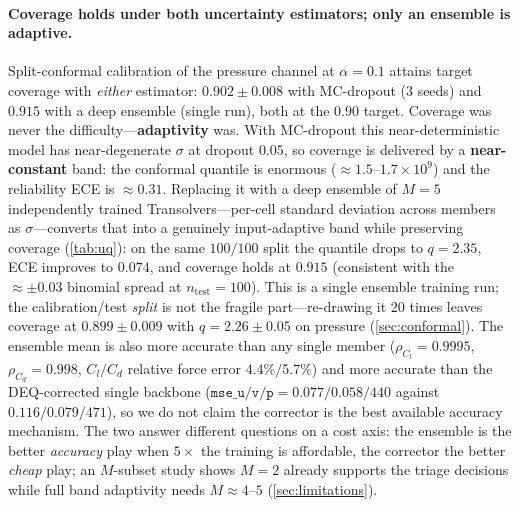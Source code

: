 \paragraph{Coverage holds under both uncertainty estimators; only an ensemble is
adaptive.} Split-conformal calibration of the pressure channel at $\alpha=0.1$ attains
target coverage with \emph{either} estimator: $0.902{\pm}0.008$ with MC-dropout (3 seeds)
and $0.915$ with a deep ensemble (single run), both at the $0.90$ target. Coverage was
never the difficulty---\textbf{adaptivity} was. With MC-dropout this near-deterministic
model has near-degenerate $\sigma$ at dropout $0.05$, so coverage is delivered by a
\textbf{near-constant} band: the conformal quantile is enormous ($\approx 1.5$--$1.7\times
10^{9}$) and the reliability ECE is $\approx 0.31$. Replacing it with a deep ensemble of
$M{=}5$ independently trained Transolvers---per-cell standard deviation across members as
$\sigma$---converts that into a genuinely input-adaptive band while preserving coverage
(\autoref{tab:uq}): on the same $100/100$ split the quantile drops to $q=2.35$, ECE
improves to $\mathbf{0.074}$, and coverage holds at $0.915$ (consistent with the
$\approx{\pm}0.03$ binomial spread at $n_{\text{test}}=100$). This is a single ensemble
training run; the calibration/test \emph{split} is not the fragile part---re-drawing it
$20$ times leaves coverage at $0.899{\pm}0.009$ with $q=2.26{\pm}0.05$ on pressure
(\autoref{sec:conformal}). The ensemble mean is also more accurate than any single member
($\rho_{C_l}=0.9995$, $\rho_{C_d}=0.998$, $C_l/C_d$ relative force error $4.4\%/5.7\%$)
and more accurate than the DEQ-corrected single backbone
($\texttt{mse\_u/v/p}=0.077/0.058/440$ against $0.116/0.079/471$), so we do not claim the
corrector is the best available accuracy mechanism. The two answer different questions on
a cost axis: the ensemble is the better \emph{accuracy} play when $5\times$ the training is
affordable, the corrector the better \emph{cheap} play; an $M$-subset study shows $M{=}2$
already supports the triage decisions while full band adaptivity needs $M{\approx}4$--$5$
(\autoref{sec:limitations}).


